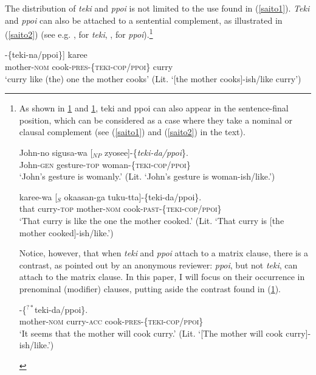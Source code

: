 \documentclass[output=paper]{langscibook}
\begin{document}
The distribution of \emph{teki} and  \emph{ppoi} is not limited to the use found in (\ref{saito1}).  \emph{Teki} and  \emph{ppoi} can also be attached to a sentential complement, as illustrated in (\ref{saito2}) (see e.g. \citealt{Yamashita2000}, \citealt{Saito2017} for \emph{teki},  \citealt{Kojima2003}, \citealt{Yamada2014} for  \emph{ppoi}).\footnote{As shown in \ref{saitoi} and \ref{saitoii}, teki and ppoi can also appear in the sentence-final position, which can be considered as a case where they take a nominal or clausal complement (see (\ref{saito1}) and (\ref{saito2}) in the text). 
\begin{exe}
\ex \label{saitoi}
\gll John-no sigusa-wa [$_{NP}$ zyosee]-\{\emph{teki-da/ppoi}\}.\\
John-\textsc{gen} gesture-\textsc{top} {} woman-\{\textsc{teki-cop/ppoi}\}\\ 
\glt `John’s gesture is womanly.' (Lit. ‘John’s gesture is woman-ish/like.’)

\ex \label{saitoii}
 {karee-wa} [$_{S}$ {okaasan-ga} {tuku-tta}]-\{{teki-da/ppoi}\}.\\
that curry-\textsc{top} {} mother-\textsc{nom} cook-\textsc{past}-\{\textsc{teki-cop/ppoi}\}\\ 
\glt ‘That curry is like the one the mother cooked.’ (Lit. ‘That curry is [the mother cooked]-ish/like.’)

\end{exe}

Notice, however, that when \emph{teki} and \emph{ppoi} attach to a matrix clause, there is a contrast, as pointed out by an anonymous reviewer: \emph{ppoi}, but not \emph{teki}, can attach to the matrix clause. In this paper, I will focus on their occurrence in prenominal (modifier) clauses, putting aside the contrast found in (\ref{saitoiii}).
\begin{exe}
\ex \label{saitoiii}
-\{$^{?*}${teki-da/ppoi}\}.\\
mother-\textsc{nom} curry-\textsc{acc} cook-\textsc{pres}-\{\textsc{teki-cop/ppoi}\}\\ 
\glt ‘It seems that the mother will cook curry.’ (Lit. ‘[The mother will cook curry]-ish/like.’)
\end{exe}
}

\begin{exe}
\ex \label{saito2}
\gll [[$_{S}$ {okaasan-ga}   {tuku-ru}]-\{{teki-na/ppoi}\}] {karee}\\
{} mother-\textsc{nom} cook-\textsc{pres}-\{\textsc{teki-cop/ppoi}\} curry\\ 
\glt ‘curry like (the) one the mother cooks’ (Lit. ‘[the mother cooks]-ish/like curry’)
\end{exe}
\end{document}
